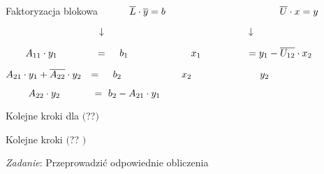 \begin{frame}{Faktoryzacja blokowa}
$\hspace*{10mm} \overline{L}\cdot\overline{y}=b\  \hspace*{40mm}\overline{U}\cdot x=y$

$\hspace*{33.5mm}\downarrow\ \hspace*{51mm} \downarrow$

$\hspace*{7mm}A_{11}\cdot y_{1}\ \hspace*{12.4mm} =\ \hspace*{3mm} b_{1}\ \hspace*{21.5mm} x_{1}\ \hspace*{15mm} = y_{1}-\overline{U_{12}}\cdot x_{2}$

$A_{21}\cdot y_{1}+\overline{A_{22}}\cdot y_{2}\hspace*{2.5mm} =\ \hspace*{3mm} b_{2}\ \hspace*{20.5mm} x_{2}\ \hspace*{23.5mm} y_{2} $

$\hspace*{8mm} A_{22}\cdot y_{2} \hspace*{11.5mm} =\ b_{2}-A_{21}\cdot y_{1}\ $

Kolejne kroki dla $($??$)$

Kolejne kroki  $($?? $)$
\begin{flushright}
{\it Zadanie}: Przeprowadzić odpowiednie obliczenia
\end{flushright}

\end{frame}